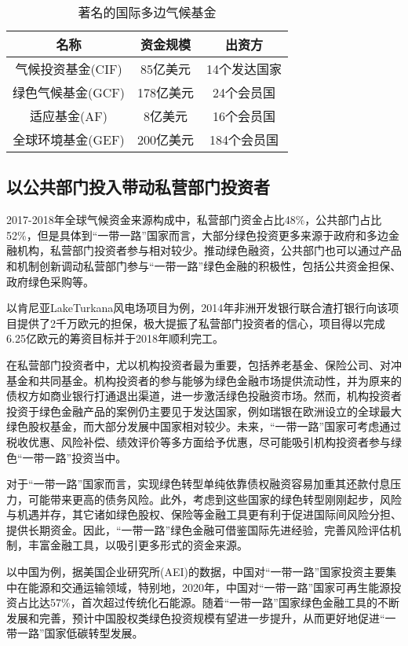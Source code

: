 \begin{table}[H]
    \centering
    \begin{tabular}{|c|c|c|}
        \hline
        名称          & 资金规模   & 出资方\\\hline
        气候投资基金(CIF) & 85亿美元  & 14个发达国家      \\
        绿色气候基金(GCF) & 178亿美元 & 24个会员国       \\
        适应基金(AF)    & 8亿美元   & 16个会员国       \\
        全球环境基金(GEF) & 200亿美元 & 184个会员国      \\\hline
    \end{tabular}
    \caption{著名的国际多边气候基金}
\end{table}

\subsection*{以公共部门投入带动私营部门投资者}

2017-2018年全球气候资金来源构成中，私营部门资金占比48\%，公共部门占比52\%，但是具体到“一带一路”国家而言，大部分绿色投资更多来源于政府和多边金融机构，私营部门投资者参与相对较少。推动绿色融资，公共部门也可以通过产品和机制创新调动私营部门参与“一带一路”绿色金融的积极性，包括公共资金担保、政府绿色采购等。

以肯尼亚LakeTurkana风电场项目为例，2014年非洲开发银行联合渣打银行向该项目提供了2千万欧元的担保，极大提振了私营部门投资者的信心，项目得以完成6.25亿欧元的筹资目标并于2018年顺利完工。

在私营部门投资者中，尤以机构投资者最为重要，包括养老基金、保险公司、对冲基金和共同基金。机构投资者的参与能够为绿色金融市场提供流动性，并为原来的债权方如商业银行打通退出渠道，进一步激活绿色投融资市场。然而，机构投资者投资于绿色金融产品的案例仍主要见于发达国家，例如瑞银在欧洲设立的全球最大绿色股权基金，而大部分发展中国家相对较少。未来，“一带一路”国家可考虑通过税收优惠、风险补偿、绩效评价等多方面给予优惠，尽可能吸引机构投资者参与绿色“一带一路”投资当中。

对于“一带一路”国家而言，实现绿色转型单纯依靠债权融资容易加重其还款付息压力，可能带来更高的债务风险。此外，考虑到这些国家的绿色转型刚刚起步，风险与机遇并存，其它诸如绿色股权、保险等金融工具更有利于促进国际间风险分担、提供长期资金。因此，“一带一路”绿色金融可借鉴国际先进经验，完善风险评估机制，丰富金融工具，以吸引更多形式的资金来源。

以中国为例，据美国企业研究所(AEI)的数据，中国对“一带一路”国家投资主要集中在能源和交通运输领域，特别地，2020年，中国对“一带一路”国家可再生能源投资占比达57\%，首次超过传统化石能源。随着“一带一路”国家绿色金融工具的不断发展和完善，预计中国股权类绿色投资规模有望进一步提升，从而更好地促进“一带一路”国家低碳转型发展。

